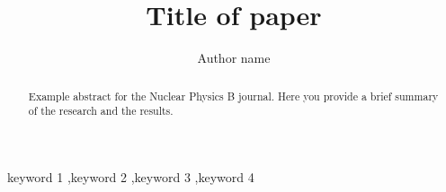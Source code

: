 \documentclass[final,5p,times,twocolumn,authoryear]{elsarticle}
\begin{document}
\begin{frontmatter}



\title{Title of paper}


\author[first]{Author name}

\begin{abstract}
Example abstract for the Nuclear Physics B journal. Here you provide a brief summary of the research and the results.
\end{abstract}



\begin{keyword}
keyword 1 \sep keyword 2 \sep keyword 3 \sep keyword 4



\end{keyword}


\end{frontmatter}
\end{document}
